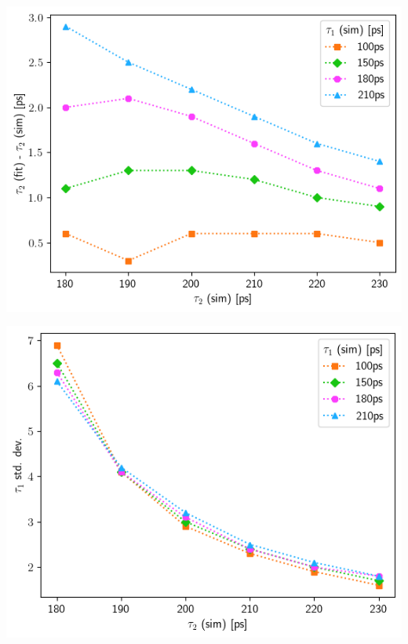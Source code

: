 {\begin{minipage}{ .47\linewidth}
    \includegraphics[width=\linewidth]{Batch 3/single Gaussian IRF/t2-diff 5050.png}
    \label{fig:compirf-t2-5050}
\end{minipage}
\hfill
\begin{minipage}{ .47\linewidth}
    \includegraphics[width=\linewidth]{Batch 3/single Gaussian IRF/t2-err 5050.png}
    \label{fig:compirf-t2err-5050}
\end{minipage}
\begin{minipage}{ .47\linewidth}

\end{minipage}}
